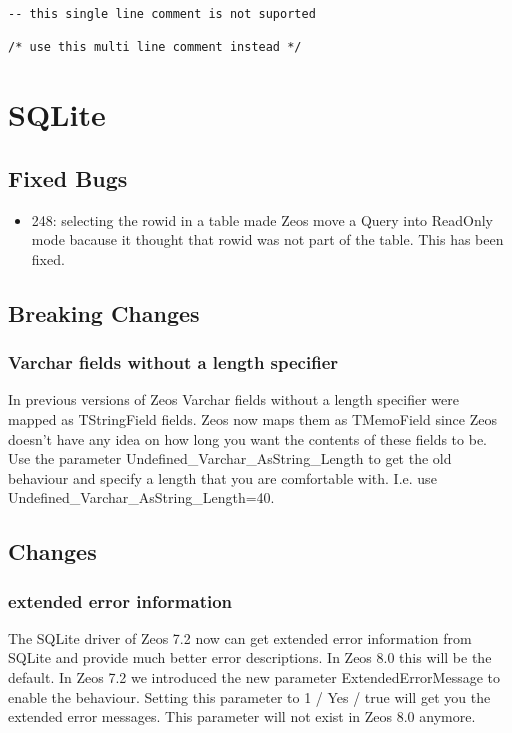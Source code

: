 \documentclass[a4paper,12pt,oneside]{book}
\begin{document}
\begin{lstlisting}
-- this single line comment is not suported

/* use this multi line comment instead */
\end{lstlisting}

\section{SQLite}
\label{sec:Rev6_SQLite}

\subsection{Fixed Bugs}
\label{sec:Rev6_SQLite_FixedBugs}

\begin{itemize}
\item	
  248: selecting the rowid in a table made Zeos move a Query into ReadOnly mode bacause it thought that rowid was not part of the table.
	This has been fixed.
\end{itemize}

\subsection{Breaking Changes}
\label{sec:Rev6_SQLite_BreakingChanges}

\subsubsection{Varchar fields without a length specifier}
\label{sec:Rev6_SQLite_BreakingChanges_VarcharWithoutLength}

In previous versions of Zeos Varchar fields without a length specifier were mapped as TStringField fields.
Zeos now maps them as TMemoField since Zeos doesn't have any idea on how long you want the contents of these fields to be.
Use the parameter Undefined\_Varchar\_AsString\_Length to get the old behaviour and specify a length that you are comfortable with.
I.e. use Undefined\_Varchar\_AsString\_Length=40.


\subsection{Changes}
\label{sec:Rev6_SQLite_Changes}

\subsubsection{extended error information}
\label{sec:Rev6_SQLite_Changes_ExtendedErrorInfo}
The SQLite driver of Zeos 7.2 now can get extended error information from SQLite and provide much better error descriptions.
In Zeos 8.0 this will be the default.
In Zeos 7.2 we introduced the new parameter ExtendedErrorMessage to enable the behaviour.
Setting this parameter to 1 / Yes / true will get you the extended error messages.
This parameter will not exist in Zeos 8.0 anymore.
\end{document}
